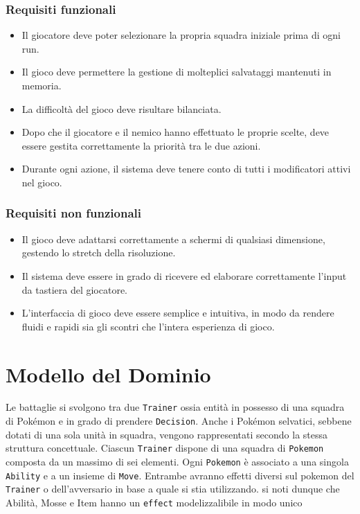 \documentclass[a4paper,12pt]{report}
\begin{document}
{\subsubsection{Requisiti funzionali}
\begin{itemize}
    \item Il giocatore deve poter selezionare la propria squadra iniziale prima di ogni run.
    \item Il gioco deve permettere la gestione di molteplici salvataggi mantenuti in memoria.
    \item La difficoltà del gioco deve risultare bilanciata.
    \item Dopo che il giocatore e il nemico hanno effettuato le proprie scelte, deve essere gestita correttamente la priorità tra le due azioni.
    \item Durante ogni azione, il sistema deve tenere conto di tutti i modificatori attivi nel gioco.
\end{itemize}

\subsubsection{Requisiti non funzionali}
\begin{itemize}
    \item Il gioco deve adattarsi correttamente a schermi di qualsiasi dimensione, gestendo lo stretch della risoluzione.
    \item Il sistema deve essere in grado di ricevere ed elaborare correttamente l'input da tastiera del giocatore.
    \item L'interfaccia di gioco deve essere semplice e intuitiva, in modo da rendere fluidi e rapidi sia gli scontri che l’intera esperienza di gioco.
\end{itemize}



\section{Modello del Dominio}


Le battaglie si svolgono tra due \texttt{Trainer} ossia entità in possesso di una squadra di Pokémon e in grado di prendere \texttt{Decision}. Anche i Pokémon selvatici, sebbene dotati di una sola unità in squadra, vengono rappresentati secondo la stessa struttura concettuale. Ciascun \texttt{Trainer} dispone di una squadra di \texttt{Pokemon} composta da un massimo di sei elementi. Ogni \texttt{Pokemon} è associato a una singola \texttt{Ability} e a un insieme di \texttt{Move}. Entrambe avranno effetti diversi sul pokemon del \texttt{Trainer} o dell'avversario in base a quale si stia utilizzando. si noti dunque che Abilità, Mosse e Item hanno un \texttt{effect} modelizzalibile in modo unico

}
\end{document}
